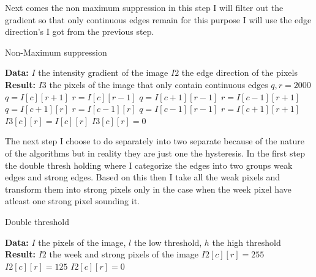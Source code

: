 Next comes the non maximum suppression in this step I will filter out the gradient so that only continuous edges remain for this purpose I will use the edge direction's I got from the previous step.

\begin{algorithm}[H]
\caption{Non-Maximum suppression}
\label{alg:max}
\begin{algorithmic}
\State \textbf{Data:} $I$ the intensity gradient of the image $I2$ the edge direction of the pixels 
\State \textbf{Result:} $I3$ the pixels of the image that only contain continuous edges
\State $q,r = 2000$
\State $q = I[c][r + 1]$
\State $r = I[c][r - 1]$
\State $q = I[c + 1][r - 1]$
\State $r = I[c - 1][r + 1]$
\State $q = I[c + 1][r]$
\State $r = I[c - 1][r]$
\State $q = I[c - 1][r - 1]$
\State $r = I[c + 1][r + 1]$
\EndIf
{}
\State $I3[c][r] = I[c][r]$
\Else
\State $I3[c][r] = 0$
\EndIf
\EndFor
\end{algorithmic}
\end{algorithm}

The next step I choose to do separately into two separate because of the nature of the  algorithms but in reality they are just one the hysteresis. In the first step the double thresh holding where I categorize the edges into two groups weak edges and strong edges. Based on this then I take all the weak pixels and transform them into strong pixels only in the case when the week pixel have atleast one strong pixel sounding it.

\begin{algorithm}[H]
\caption{Double threshold}
\label{alg:thresh}
\begin{algorithmic}
\State \textbf{Data:} $I$ the pixels of the image, $l$ the low threshold, $h$ the high threshold
\State \textbf{Result:} $I2$ the week and strong pixels of the image
\State $I2[c][r] = 255$
\State $I2[c][r] = 125$
\Else
\State $I2[c][r] = 0$
\EndIf
\EndFor
\end{algorithmic}
\end{algorithm}

